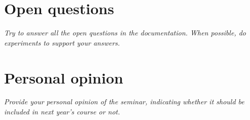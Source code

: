 \documentclass[a4paper, 10pt]{article}
\begin{document}
\section{Open questions}

\textit{Try to answer all the open questions in the documentation. When possible, do experiments to support your answers.}

\section{Personal opinion}

\textit{Provide your personal opinion of the seminar, indicating whether it should be included in next year's course or not.}
\end{document}
